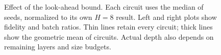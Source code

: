 \begin{figure}[!t]
  \centering
  \resizebox{\columnwidth}{!}{}
  \caption{Effect of the look-ahead bound. Each circuit uses the median of \HorizonExtSeedN{} seeds, normalized to its own $H=8$ result. Left and right plots show fidelity and batch ratios. Thin lines retain every circuit; thick lines show the geometric mean of \HorizonExtCompleteN{} circuits. Actual depth also depends on remaining layers and size budgets.}
  \label{fig:experimental-summary}
\end{figure}
